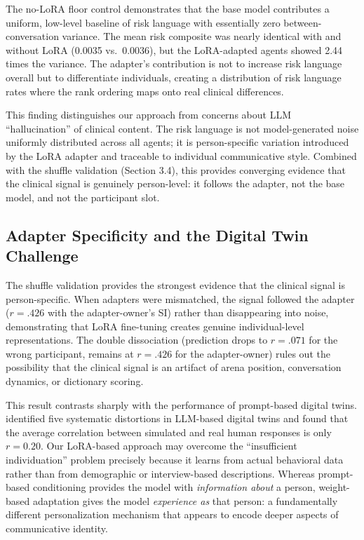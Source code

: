 \documentclass[review,12pt,authoryear]{elsarticle}
\begin{document}
The no-LoRA floor control demonstrates that the base model contributes a uniform, low-level baseline of risk language with essentially zero between-conversation variance. The mean risk composite was nearly identical with and without LoRA (0.0035 vs.\ 0.0036), but the LoRA-adapted agents showed 2.44 times the variance. The adapter's contribution is not to increase risk language overall but to differentiate individuals, creating a distribution of risk language rates where the rank ordering maps onto real clinical differences.

This finding distinguishes our approach from concerns about LLM ``hallucination'' of clinical content. The risk language is not model-generated noise uniformly distributed across all agents; it is person-specific variation introduced by the LoRA adapter and traceable to individual communicative style. Combined with the shuffle validation (Section 3.4), this provides converging evidence that the clinical signal is genuinely person-level: it follows the adapter, not the base model, and not the participant slot.

\subsection{Adapter Specificity and the Digital Twin Challenge}

The shuffle validation provides the strongest evidence that the clinical signal is person-specific. When adapters were mismatched, the signal followed the adapter ($r = .426$ with the adapter-owner's SI) rather than disappearing into noise, demonstrating that LoRA fine-tuning creates genuine individual-level representations. The double dissociation (prediction drops to $r = .071$ for the wrong participant, remains at $r = .426$ for the adapter-owner) rules out the possibility that the clinical signal is an artifact of arena position, conversation dynamics, or dictionary scoring.

This result contrasts sharply with the performance of prompt-based digital twins. \citet{peng2025funhouse} identified five systematic distortions in LLM-based digital twins and found that the average correlation between simulated and real human responses is only $r = 0.20$. Our LoRA-based approach may overcome the ``insufficient individuation'' problem precisely because it learns from actual behavioral data rather than from demographic or interview-based descriptions. Whereas prompt-based conditioning provides the model with \textit{information about} a person, weight-based adaptation gives the model \textit{experience as} that person: a fundamentally different personalization mechanism that appears to encode deeper aspects of communicative identity.
\end{document}
